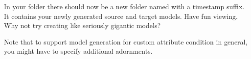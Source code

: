 In your  folder there should now be a new folder named  with a timestamp suffix. 
It contains your newly generated source and target models.
Have fun viewing.
Why not try creating like seriously gigantic models?

Note that to support model generation for custom attribute condition in general, you might have to specify additional  adornments.
